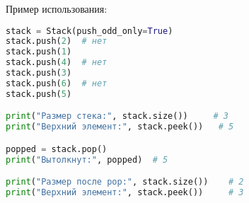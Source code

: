 \begin{enumerate}
Пример использования:
\begin{lstlisting}[language=Python]
stack = Stack(push_odd_only=True)
stack.push(2)  # нет
stack.push(1)
stack.push(4)  # нет
stack.push(3)
stack.push(6)  # нет
stack.push(5)

print("Размер стека:", stack.size())     # 3
print("Верхний элемент:", stack.peek())   # 5

popped = stack.pop()
print("Вытолкнут:", popped)  # 5

print("Размер после pop:", stack.size())    # 2
print("Верхний элемент:", stack.peek())     # 3
\end{lstlisting}

\end{enumerate}
